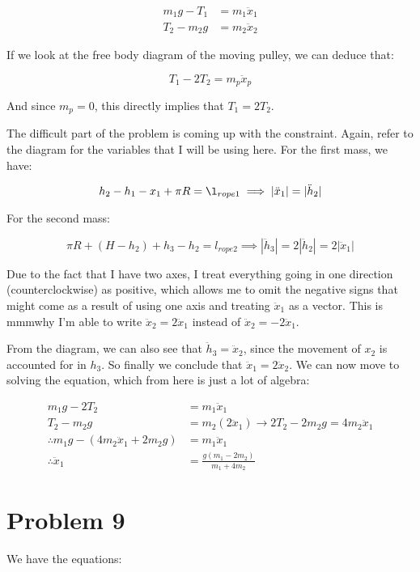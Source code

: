 \documentclass{article}
\theoremstyle{definition}
\numberwithin{equation}{section}
\numberwithin{definition}{section}
\begin{document}
	\begin{align*}
		m_1g - T_1 &= m_1 \ddot x_1\\
		T_2 - m_2g &= m_2 \ddot x_2
	\end{align*}

	If we look at the free body diagram of the moving pulley, we can deduce that:
	
	\[ T_1 - 2T_2 = m_p\ddot x_p\]
	
	And since $m_p = 0$, this directly implies that $T_1 = 2T_2$.
	
	\medskip
	The difficult part of the problem is coming up with the constraint. Again, refer to the diagram for the variables that I will be using here. For the first mass, we have:
	
	\[ h_2 - h_1 - x_1 + \pi R = \l_{rope1} \implies |\ddot x_1| = |\ddot h_2|\]
	
	For the second mass:
	
	\[ \pi R + (H - h_2) + h_3-h_2 = l_{rope2} \implies |\ddot h_3| = 2|\ddot h_2| = 2 |\ddot x_1|\]

\begin{remark}
	Due to the fact that I have two axes, I treat everything going in one direction (counterclockwise) as positive, which allows me to omit the negative signs that might come as a result of using one axis and treating $\ddot x_1$ as a vector. This is  mmmwhy I'm able to write $\ddot x_2 = 2\ddot x_1$ instead of $\ddot x_2 = -2\ddot x_1$.
	\end{remark}
	
	From the diagram, we can also see that $\ddot h_3 = \ddot x_2$, since the movement of $x_2$ is accounted for in $h_3$. So finally we conclude that $\ddot x_1 = 2\ddot x_2$. We can now move to solving the equation, which from here is just a lot of algebra:
	
	
	\begin{align*}
		  m_1g - 2T_2 &= m_1 \ddot x_1\\
		  T_2 - m_2g &= m_2(2\ddot x_1) \longrightarrow 2T_2 - 2m_2g = 4m_2\ddot x_1\\
		  \therefore m_1g - (4m_2\ddot x_1 + 2m_2g) &= m_1\ddot x_1\\
		  \therefore \ddot x_1 &= \frac{g(m_1 - 2m_2)}{m_1 + 4m_2}
	\end{align*}

	\section{Problem 9}
	We have the equations:
	
\end{document}
